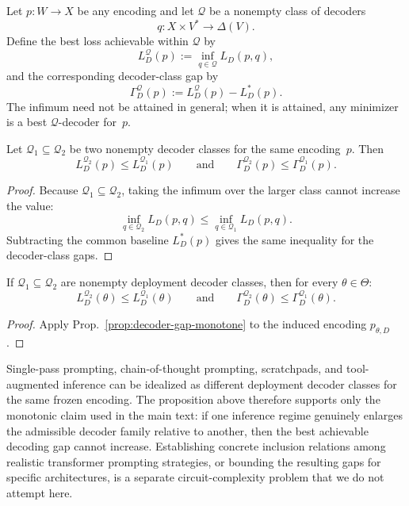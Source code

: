 \documentclass[twoside,11pt]{article}
\newcommand{\propref}[1]{Prop.~\ref{#1}}
\begin{document}
\begin{definition}
Let $p \colon W \to X$ be any encoding and let $\mathcal{Q}$ be a nonempty class of decoders
\[
q \colon X \times V^* \to \Delta(V).
\]
Define the best loss achievable within $\mathcal{Q}$ by
\[
L_D^{\mathcal{Q}}(p)
:= \inf_{q \in \mathcal{Q}} L_D(p,q),
\]
and the corresponding decoder-class gap by
\[
\Gamma_D^{\mathcal{Q}}(p)
:= L_D^{\mathcal{Q}}(p)-L_D^*(p).
\]
The infimum need not be attained in general; when it is attained, any minimizer is a best $\mathcal{Q}$-decoder for~$p$.
\end{definition}

\begin{proposition}\label{prop:decoder-gap-monotone}
Let $\mathcal{Q}_1 \subseteq \mathcal{Q}_2$ be two nonempty decoder classes for the same encoding~$p$. Then
\[
L_D^{\mathcal{Q}_2}(p) \le L_D^{\mathcal{Q}_1}(p)
\qquad\text{and}\qquad
\Gamma_D^{\mathcal{Q}_2}(p) \le \Gamma_D^{\mathcal{Q}_1}(p).
\]
\end{proposition}

\begin{proof}
Because $\mathcal{Q}_1 \subseteq \mathcal{Q}_2$, taking the infimum over the larger class cannot increase the value:
\[
\inf_{q\in\mathcal{Q}_2} L_D(p,q)
\le
\inf_{q\in\mathcal{Q}_1} L_D(p,q).
\]
Subtracting the common baseline $L_D^*(p)$ gives the same inequality for the decoder-class gaps.
\end{proof}

\begin{corollary}
If $\mathcal{Q}_1 \subseteq \mathcal{Q}_2$ are nonempty deployment decoder classes, then for every $\theta \in \Theta$:
\[
L_D^{\mathcal{Q}_2}(\theta) \le L_D^{\mathcal{Q}_1}(\theta)
\qquad\text{and}\qquad
\Gamma_D^{\mathcal{Q}_2}(\theta) \le \Gamma_D^{\mathcal{Q}_1}(\theta).
\]
\end{corollary}

\begin{proof}
Apply \propref{prop:decoder-gap-monotone} to the induced encoding $p_{\theta,D}$.
\end{proof}

\begin{remark}[Interpretation]
Single-pass prompting, chain-of-thought prompting, scratchpads, and tool-augmented inference can be idealized as different deployment decoder classes for the same frozen encoding. The proposition above therefore supports only the monotonic claim used in the main text: if one inference regime genuinely enlarges the admissible decoder family relative to another, then the best achievable decoding gap cannot increase. Establishing concrete inclusion relations among realistic transformer prompting strategies, or bounding the resulting gaps for specific architectures, is a separate circuit-complexity problem that we do not attempt here.
\end{remark}
\end{document}
